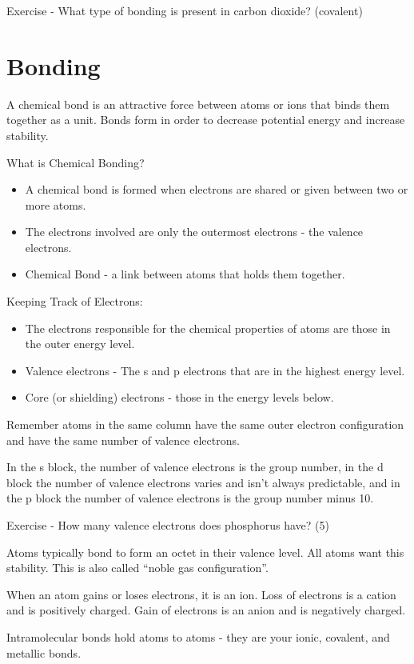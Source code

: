\documentclass[../hchem.tex]{subfiles}
\begin{document}
Exercise - What type of bonding is present in carbon dioxide? (covalent)

\section{Bonding}
A chemical bond is an attractive force between atoms or ions that binds them together as a unit. Bonds form in order to decrease potential energy and increase stability.

What is Chemical Bonding?
\begin{itemize}
    \item A chemical bond is formed when electrons are shared or given between two or more atoms.
    \item The electrons involved are only the outermost electrons - the valence electrons.
    \item Chemical Bond - a link between atoms that holds them together.
\end{itemize}

Keeping Track of Electrons:
\begin{itemize}
    \item The electrons responsible for the chemical properties of atoms are those in the outer energy level.
    \item Valence electrons - The s and p electrons that are in the highest energy level.
    \item Core (or shielding) electrons - those in the energy levels below.
\end{itemize}

Remember atoms in the same column have the same outer electron configuration and have the same number of valence electrons.

In the s block, the number of valence electrons is the group number, in the d block the number of valence electrons 
varies and isn't always predictable, and in the p block the number of valence electrons is the group number minus 10.

Exercise - How many valence electrons does phosphorus have? (5)

Atoms typically bond to form an octet in their valence level. All atoms want this stability. This is also called ``noble gas configuration''.

When an atom gains or loses electrons, it is an ion. Loss of electrons is a cation and is positively charged. Gain of electrons is an anion and is negatively charged.

Intramolecular bonds hold atoms to atoms - they are your ionic, covalent, and metallic bonds.
\end{document}

